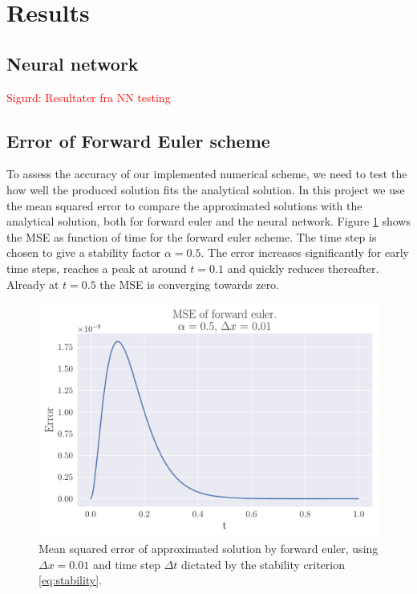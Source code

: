 \documentclass[12pt]{extarticle}
\begin{document}
\section{Results}

\subsection{Neural network}
\textcolor{red}{Sigurd: Resultater fra NN testing}

\subsection{Error of Forward Euler scheme}

To assess the accuracy of our implemented numerical scheme, we need to test the how well the produced solution fits the analytical solution. In this project we use the mean squared error to compare the approximated solutions with the analytical solution, both for forward euler and the neural network. Figure \ref{fig:FE_MSE} shows the MSE as function of time for the forward euler scheme. The time step is chosen to give a stability factor $\alpha=0.5$. The error increases significantly for early time steps, reaches a peak at around $t=0.1$ and quickly reduces thereafter. Already at $t=0.5$ the MSE is converging towards zero.

\begin{figure}[h]
	\centering
	\includegraphics[scale=0.5]{../output/plots/MSE_FE_dx_001.pdf}
	\caption{Mean squared error of approximated solution by forward euler, using $\Delta x=0.01$ and time step $\Delta t$ dictated by the stability criterion \eqref{eq:stability}.}
	\label{fig:FE_MSE}
\end{figure}
\end{document}
